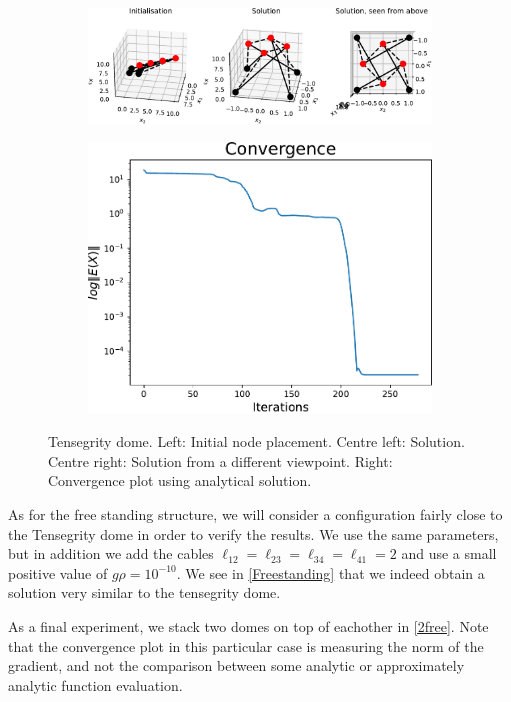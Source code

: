 \begin{figure}[!ht]
\centering
\begin{subfigure}{.72\textwidth}
  \centering
  \includegraphics[width=0.99\linewidth]{Bilder/P69.pdf}
\end{subfigure}%
\begin{subfigure}{.3\textwidth}
  \centering
  \includegraphics[width=0.99\linewidth]{Bilder/P69conv.pdf}
\end{subfigure}
\caption{Tensegrity dome. Left: Initial node placement. Centre left: Solution. Centre right: Solution from a different viewpoint. Right: Convergence plot using analytical solution.}
\label{P69}
\end{figure}
As for the free standing structure, we will consider a configuration fairly close to the Tensegrity dome in order to verify the results. We use the same parameters, but in addition we add the cables 
$\ell_{12} = \ell_{23} = \ell_{34} = \ell_{41} = 2 $ and use a small positive value of $g \rho = 10^{-10}$. We see in \eqref{Freestanding} that we indeed obtain a solution very similar to the tensegrity dome.

As a final experiment, we stack two domes on top of eachother in \ref{2free}. Note that the convergence plot in this particular case is measuring the norm of the gradient, and not the comparison between some analytic or approximately analytic function evaluation.

